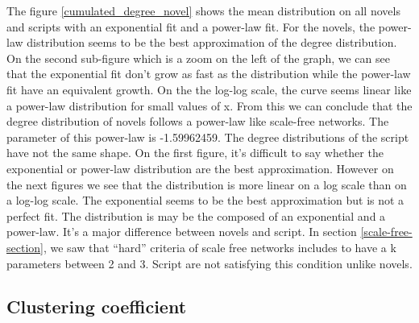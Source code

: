 \documentclass[a4paper, 12pt]{report}
\begin{document}
The figure \ref{cumulated_degree_novel} shows the mean distribution on all novels and scripts with an exponential fit and a power-law fit. For the novels, the  power-law distribution seems to be the best approximation of the degree distribution. On the second sub-figure which is a zoom on the left of the graph, we can see that the exponential fit don't grow as fast as the distribution while the  power-law fit have an equivalent growth. On the the log-log scale, the curve seems linear like a  power-law distribution for small values of x. From this we can conclude that the degree distribution of novels follows a power-law like scale-free networks. The parameter of this power-law is -1.59962459. 
The degree distributions of the script have not the same shape. On the first figure, it's difficult to say whether the exponential or power-law distribution are the best approximation. However on the next figures we see that the distribution is more linear on a log scale than on a log-log scale. The exponential seems to be the best approximation but is not a perfect fit. The distribution is may be the composed of an exponential and a power-law. It's a major difference between novels and script. In section \ref{scale-free-section}, we saw that ``hard'' criteria of scale free networks includes to have a k parameters between 2 and 3. Script are not satisfying this condition unlike novels.\\

\subsection{Clustering coefficient}
\end{document}
